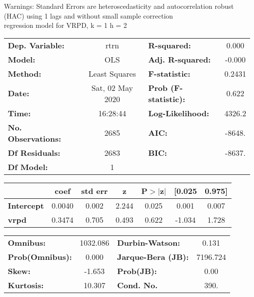 Warnings: \newline
 [1] Standard Errors are heteroscedasticity and autocorrelation robust (HAC) using 1 lags and without small sample correction\\ 

regression model for VRPD, k = 1 h = 2\begin{center}
\begin{tabular}{lclc}
\toprule
\textbf{Dep. Variable:}    &       rtrn       & \textbf{  R-squared:         } &     0.000   \\
\textbf{Model:}            &       OLS        & \textbf{  Adj. R-squared:    } &    -0.000   \\
\textbf{Method:}           &  Least Squares   & \textbf{  F-statistic:       } &    0.2431   \\
\textbf{Date:}             & Sat, 02 May 2020 & \textbf{  Prob (F-statistic):} &    0.622    \\
\textbf{Time:}             &     16:28:44     & \textbf{  Log-Likelihood:    } &    4326.2   \\
\textbf{No. Observations:} &        2685      & \textbf{  AIC:               } &    -8648.   \\
\textbf{Df Residuals:}     &        2683      & \textbf{  BIC:               } &    -8637.   \\
\textbf{Df Model:}         &           1      & \textbf{                     } &             \\
\bottomrule
\end{tabular}
\begin{tabular}{lcccccc}
                   & \textbf{coef} & \textbf{std err} & \textbf{z} & \textbf{P$> |$z$|$} & \textbf{[0.025} & \textbf{0.975]}  \\
\midrule
\textbf{Intercept} &       0.0040  &        0.002     &     2.244  &         0.025        &        0.001    &        0.007     \\
\textbf{vrpd}      &       0.3474  &        0.705     &     0.493  &         0.622        &       -1.034    &        1.728     \\
\bottomrule
\end{tabular}
\begin{tabular}{lclc}
\textbf{Omnibus:}       & 1032.086 & \textbf{  Durbin-Watson:     } &    0.131  \\
\textbf{Prob(Omnibus):} &   0.000  & \textbf{  Jarque-Bera (JB):  } & 7196.724  \\
\textbf{Skew:}          &  -1.653  & \textbf{  Prob(JB):          } &     0.00  \\
\textbf{Kurtosis:}      &  10.307  & \textbf{  Cond. No.          } &     390.  \\
\bottomrule
\end{tabular}
\end{center}

